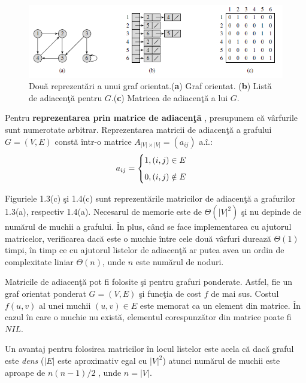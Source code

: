 \documentclass[11pt,a4paper]{report}
\begin{document}
    \begin{figure}[!hbt]
	\centering
	\includegraphics[width=13.2cm]{Figura5.png}
	\caption{Dou\u a reprezent\u ari a unui graf orientat.(\textbf{a}) Graf orientat. \centering \newline(\textbf{b}) List\u a de adiacen\c t\u a pentru $G$.(\textbf{c}) Matricea de adiacen\c t\u a a lui $G$.}
    \end{figure}
    
    
    Pentru \textbf{reprezentarea prin matrice de adiacen\c t\u a} \cite{Cormen}, presupunem c\u a v\^ arfurile sunt numerotate arbitrar. Reprezentarea matricii de adiacen\c t\u a a grafului $G=(V,E)$ const\u a \^ intr-o matrice $A_{|V|\times |V|}=(a_{ij})$ a.\^ i.:
    \begin{equation*}
    a_{ij}=\begin{cases}
    1, (i,j)\in E \medskip \\
    0, (i,j)\notin E
    \end{cases}
    \end{equation*}
    
    Figuriele 1.3(c) \c si 1.4(c) sunt reprezent\u arile matricilor de adiacen\c t\u a a grafurilor 1.3(a), respectiv 1.4(a). Necesarul de memorie este de $\Theta(|V|^2)$ \c si nu depinde de num\u arul de muchii a grafului. \^ In plus, c\^ and se face implementarea cu ajutorul matricelor, verificarea dac\u a este o muchie \^ intre cele dou\u a v\^ arfuri dureaz\u a $\Theta(1)$ timpi, \^ in timp ce cu ajutorul listelor de adiacen\c t\u a ar putea avea un ordin de complexitate liniar $\Theta(n)$, unde $n$ este  num\u arul de noduri.
    
     Matricile de adiacen\c t\u a pot fi folosite \c si pentru grafuri ponderate. Astfel, fie un graf orientat ponderat $G=(V,E)$ \c si func\c tia de cost $f$ de mai sus. Costul $f(u,v)$ al unei muchii $(u,v)\in E$ este memorat ca un element din matrice. \^ In cazul \^ in care o muchie nu exist\u a, elementul corespunz\u ator din matrice poate fi $NIL$.
    
    Un avantaj pentru folosirea matricilor \^ in locul listelor este acela c\u a dac\u a graful este \textit{dens} ($|E|$ este aproximativ egal cu  $|V|^2$) atunci num\u arul de muchii este aproape de $n(n-1)/2$ , unde $n=|V|$.
\end{document}
